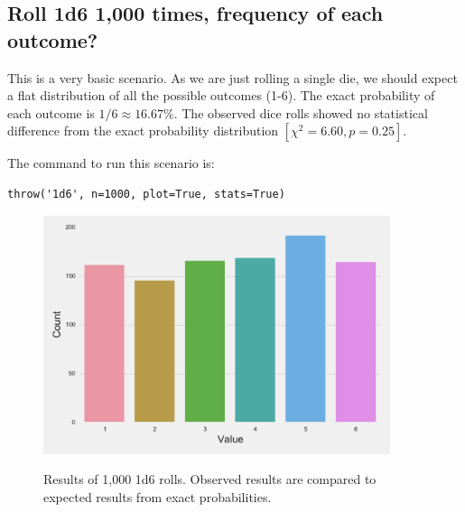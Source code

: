 \documentclass{article}
\begin{document}
\subsection{Roll 1d6 1,000 times, frequency of each outcome?}
This is a very basic scenario. As we are just rolling a single die, we should expect a flat distribution of all the possible outcomes (1-6). The exact probability of each outcome is $1/6 \approx 16.67\%$. The observed dice rolls showed no statistical difference from the exact probability distribution $[\chi^2=6.60, p=0.25]$.

The command to run this scenario is:
\begin{lstlisting}
throw('1d6', n=1000, plot=True, stats=True)
\end{lstlisting}

\begin{figure}[H]
\begin{floatrow}
\includegraphics[width=4in]{1d6.pdf}
{%
}
\end{floatrow}
\caption{Results of 1,000 1d6 rolls.  Observed results are compared to expected results from exact probabilities.}
\end{figure}
\end{document}
